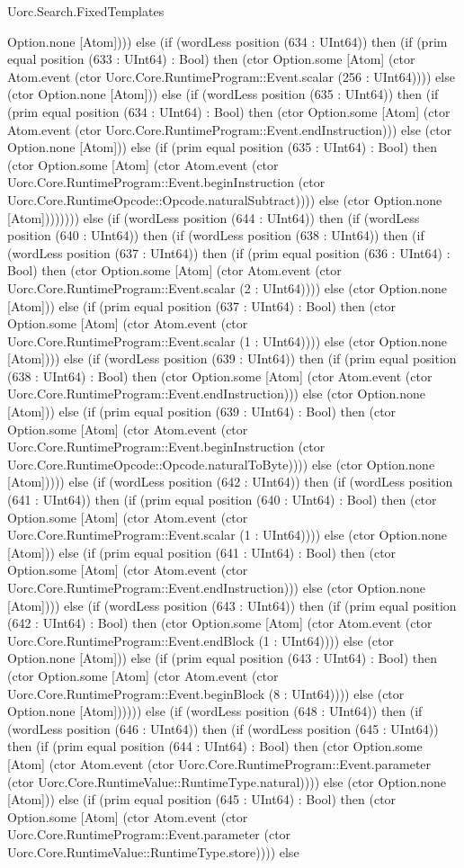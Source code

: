 \begin{lexlean}{Uorc.Search.FixedTemplates}
\begin{semanticmodule}
{Option.none [Atom]))) else (if (wordLess position (634 : UInt64)) then (if (prim equal position (633 : UInt64) : Bool) then (ctor Option.some [Atom] (ctor Atom.event (ctor Uorc.Core.RuntimeProgram::Event.scalar (256 : UInt64)))) else (ctor Option.none [Atom])) else (if (wordLess position (635 : UInt64)) then (if (prim equal position (634 : UInt64) : Bool) then (ctor Option.some [Atom] (ctor Atom.event (ctor Uorc.Core.RuntimeProgram::Event.endInstruction))) else (ctor Option.none [Atom])) else (if (prim equal position (635 : UInt64) : Bool) then (ctor Option.some [Atom] (ctor Atom.event (ctor Uorc.Core.RuntimeProgram::Event.beginInstruction (ctor Uorc.Core.RuntimeOpcode::Opcode.naturalSubtract)))) else (ctor Option.none [Atom]))))))) else (if (wordLess position (644 : UInt64)) then (if (wordLess position (640 : UInt64)) then (if (wordLess position (638 : UInt64)) then (if (wordLess position (637 : UInt64)) then (if (prim equal position (636 : UInt64) : Bool) then (ctor Option.some [Atom] (ctor Atom.event (ctor Uorc.Core.RuntimeProgram::Event.scalar (2 : UInt64)))) else (ctor Option.none [Atom])) else (if (prim equal position (637 : UInt64) : Bool) then (ctor Option.some [Atom] (ctor Atom.event (ctor Uorc.Core.RuntimeProgram::Event.scalar (1 : UInt64)))) else (ctor Option.none [Atom]))) else (if (wordLess position (639 : UInt64)) then (if (prim equal position (638 : UInt64) : Bool) then (ctor Option.some [Atom] (ctor Atom.event (ctor Uorc.Core.RuntimeProgram::Event.endInstruction))) else (ctor Option.none [Atom])) else (if (prim equal position (639 : UInt64) : Bool) then (ctor Option.some [Atom] (ctor Atom.event (ctor Uorc.Core.RuntimeProgram::Event.beginInstruction (ctor Uorc.Core.RuntimeOpcode::Opcode.naturalToByte)))) else (ctor Option.none [Atom])))) else (if (wordLess position (642 : UInt64)) then (if (wordLess position (641 : UInt64)) then (if (prim equal position (640 : UInt64) : Bool) then (ctor Option.some [Atom] (ctor Atom.event (ctor Uorc.Core.RuntimeProgram::Event.scalar (1 : UInt64)))) else (ctor Option.none [Atom])) else (if (prim equal position (641 : UInt64) : Bool) then (ctor Option.some [Atom] (ctor Atom.event (ctor Uorc.Core.RuntimeProgram::Event.endInstruction))) else (ctor Option.none [Atom]))) else (if (wordLess position (643 : UInt64)) then (if (prim equal position (642 : UInt64) : Bool) then (ctor Option.some [Atom] (ctor Atom.event (ctor Uorc.Core.RuntimeProgram::Event.endBlock (1 : UInt64)))) else (ctor Option.none [Atom])) else (if (prim equal position (643 : UInt64) : Bool) then (ctor Option.some [Atom] (ctor Atom.event (ctor Uorc.Core.RuntimeProgram::Event.beginBlock (8 : UInt64)))) else (ctor Option.none [Atom]))))) else (if (wordLess position (648 : UInt64)) then (if (wordLess position (646 : UInt64)) then (if (wordLess position (645 : UInt64)) then (if (prim equal position (644 : UInt64) : Bool) then (ctor Option.some [Atom] (ctor Atom.event (ctor Uorc.Core.RuntimeProgram::Event.parameter (ctor Uorc.Core.RuntimeValue::RuntimeType.natural)))) else (ctor Option.none [Atom])) else (if (prim equal position (645 : UInt64) : Bool) then (ctor Option.some [Atom] (ctor Atom.event (ctor Uorc.Core.RuntimeProgram::Event.parameter (ctor Uorc.Core.RuntimeValue::RuntimeType.store)))) else }
\end{semanticmodule}
\end{lexlean}
